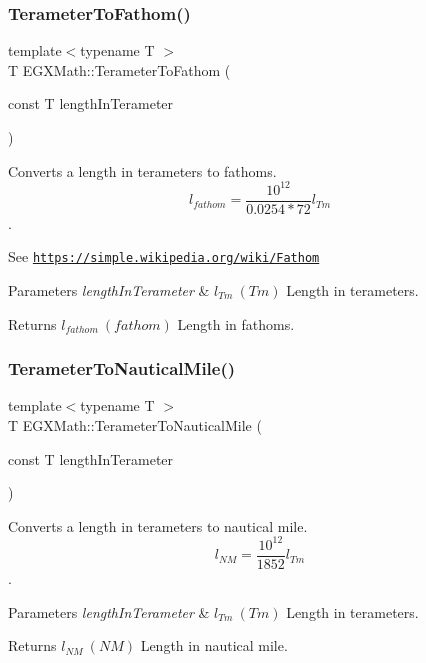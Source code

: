 \subsubsection{\texorpdfstring{Terameter\+To\+Fathom()}{TerameterToFathom()}}
{\footnotesize\ttfamily template$<$typename T $>$ \\
T E\+G\+X\+Math\+::\+Terameter\+To\+Fathom (\begin{DoxyParamCaption}\item[{const T}]{length\+In\+Terameter }\end{DoxyParamCaption})}



Converts a length in terameters to fathoms. \[ l_{fathom}= \frac{10^{12}}{0.0254 * 72} l_{Tm} \]. 

See \href{https://simple.wikipedia.org/wiki/Fathom}{\tt https\+://simple.\+wikipedia.\+org/wiki/\+Fathom} 
\begin{DoxyParams}{Parameters}
{\em length\+In\+Terameter} & $ l_{Tm}\ (Tm)$ Length in terameters. \\
\hline
\end{DoxyParams}
\begin{DoxyReturn}{Returns}
$ l_{fathom}\ (fathom)$ Length in fathoms. 
\end{DoxyReturn}
\mbox{\label{group___e_g_x_math-_conversions-_length_conversions-_s_i-_terameter-_nautical_ga6a799ea329334a189c2ed5a898a238af}} 
\subsubsection{\texorpdfstring{Terameter\+To\+Nautical\+Mile()}{TerameterToNauticalMile()}}
{\footnotesize\ttfamily template$<$typename T $>$ \\
T E\+G\+X\+Math\+::\+Terameter\+To\+Nautical\+Mile (\begin{DoxyParamCaption}\item[{const T}]{length\+In\+Terameter }\end{DoxyParamCaption})}



Converts a length in terameters to nautical mile. \[ l_{NM}= \frac{10^{12}}{1852} l_{Tm} \]. 


\begin{DoxyParams}{Parameters}
{\em length\+In\+Terameter} & $ l_{Tm}\ (Tm)$ Length in terameters. \\
\hline
\end{DoxyParams}
\begin{DoxyReturn}{Returns}
$ l_{NM}\ (NM)$ Length in nautical mile. 
\end{DoxyReturn}
